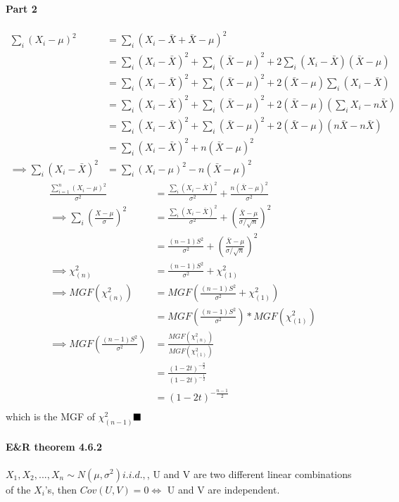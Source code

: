\documentclass[11pt]{article}
\newcommand{\qed}[0]{$\hfill\blacksquare$}
\begin{document}
\paragraph{Part 2}
\begin{align*}
	\sum_i(X_i - \mu)^2 &= \sum_i(X_i - \bar X + \bar X - \mu)^2 \\
	&= \sum_i(X_i - \bar X)^2 + \sum_i(\bar X - \mu)^2 + 2\sum_i(X_i - \bar X)(\bar X - \mu)\\
	&= \sum_i(X_i - \bar X)^2 + \sum_i(\bar X - \mu)^2 + 2(\bar X - \mu)\sum_i(X_i - \bar X)\\
	&= \sum_i(X_i - \bar X)^2 + \sum_i(\bar X - \mu)^2 + 2(\bar X - \mu)(\sum_i X_i - n\bar X)\\
	&= \sum_i(X_i - \bar X)^2 + \sum_i(\bar X - \mu)^2 + 2(\bar X - \mu)(n\bar X - n\bar X)\\
	&= \sum_i(X_i - \bar X)^2 + n(\bar X - \mu)^2 \\
	\implies \sum_i(X_i - \bar X)^2 &= \sum_i(X_i - \mu)^2 - n(\bar X - \mu)^2
\end{align*}
\begin{align*}
\frac{\sum_{i=1}^n(X_i - \mu)^2}{\sigma^2} &= \frac{\sum_i(X_i - \bar X)^2}{\sigma^2} + \frac{ n(\bar X - \mu)^2}{\sigma^2} \\
	\implies \sum_{i}(\frac{X - \mu}{\sigma})^2 &= \frac{\sum_i(X_i - \bar X)^2}{\sigma^2} + (\frac{\bar X - \mu}{\sigma/\sqrt{n}})^2 \\
	&= \frac{(n-1)S^2}{\sigma^2} + (\frac{\bar X - \mu}{\sigma/\sqrt{n}})^2 \\
	\implies \chi_{(n)}^2 &= \frac{(n-1)S^2}{\sigma^2} + \chi^2_{(1)}\\
	\implies MGF(\chi_{(n)}^2) &= MGF(\frac{(n-1)S^2}{\sigma^2} + \chi^2_{(1)})\\
	&= MGF(\frac{(n-1)S^2}{\sigma^2})* MGF(\chi^2_{(1)})\\
	\implies MGF(\frac{(n-1)S^2}{\sigma^2}) &=  \frac{MGF(\chi_{(n)}^2)}{MGF(\chi^2_{(1)})}\\
	&= \frac{(1-2t)^{-\frac{n}{2}}}{(1-2t)^{-\frac{1}{2}}} \\
	&= (1-2t)^{-\frac{n-1}{2}} \\
\end{align*}
which is the MGF of $\chi^2_{(n-1)}$\qed
\paragraph{E\&R theorem 4.6.2}
 $X_1, X_2,..., X_n \sim N(\mu,\sigma ^2)i.i.d., $, U and V are two different linear combinations of the $X_i$'s, then \newline
 $Cov(U,V) = 0 \iff$ U and V are independent.
\end{document}
